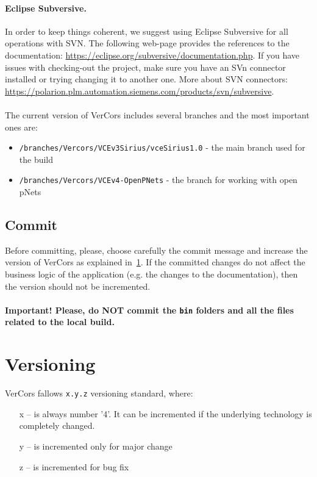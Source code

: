 \documentclass[12pt]{article}
\begin{document}
\paragraph{Eclipse Subversive.} In order to keep things coherent, we suggest using Eclipse Subversive for all operations with SVN. The following web-page provides the references to the documentation: \url{https://eclipse.org/subversive/documentation.php}. If you have issues with checking-out the project, make sure you have an SVn connector installed or trying changing it to another one. More about SVN connectors: \url{https://polarion.plm.automation.siemens.com/products/svn/subversive}.

\paragraph{} The current version of VerCors includes several branches and the most important ones are:
\begin{itemize}
\item
\texttt{/branches/Vercors/VCEv3Sirius/vceSirius1.0} - the main branch used for the build
\item
\texttt{/branches/Vercors/VCEv4-OpenPNets} - the branch for working with open pNets
\end{itemize} 

\subsection{Commit}

Before committing, please, choose carefully the commit message and increase the version of VerCors as explained in~\ref{sec:versioning}. If the committed changes do not affect the business logic of the application (e.g. the changes to the documentation), then the version should not be incremented.

\paragraph{Important! Please, do NOT commit the \texttt{bin} folders and all the files related to the local build.}


\section{Versioning}
\label{sec:versioning}

VerCors fallows \texttt{x.y.z} versioning standard, where:
\begin{itemize}
\item[x]
 – is always number '4'. It can be incremented if the underlying technology is completely changed.
\item[y]
 – is incremented only for major change
\item[z]
 – is incremented for bug fix
 \end{itemize}
\end{document}
